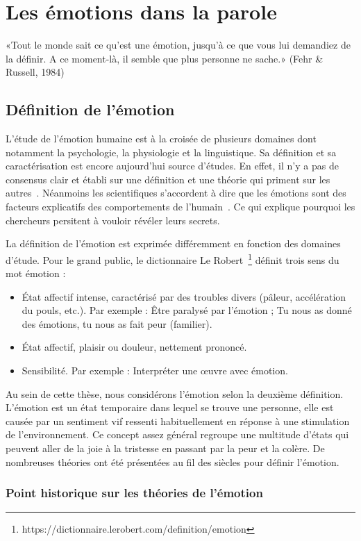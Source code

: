 \chapter{Les émotions dans la parole}
\label{chapitre1}
 	«Tout le monde sait ce qu’est une émotion, jusqu’à ce que vous lui demandiez de la définir. A ce moment-là, il semble que plus personne ne sache.» (Fehr \& Russell, 1984)


 \section{Définition de l'émotion}
L'étude de l'émotion humaine est à la croisée de plusieurs domaines dont notamment la psychologie, la physiologie et la linguistique. Sa définition et sa caractérisation est encore aujourd'hui source d'études. En effet, il n'y a pas de consensus clair et établi sur une définition et une théorie qui priment sur les autres~\cite{Kleinginna1981,Strongman1996}. Néanmoins les scientifiques s'accordent à dire que les émotions sont des facteurs explicatifs des comportements de l'humain~\cite{Gorman2003}. Ce qui explique pourquoi les chercheurs persitent à vouloir révéler leurs secrets.

La définition de l'émotion est exprimée différemment en fonction des domaines d'étude. Pour le grand public, le dictionnaire Le Robert~\footnote{https://dictionnaire.lerobert.com/definition/emotion} définit trois sens du mot émotion :
\begin{itemize}
    \item État affectif intense, caractérisé par des troubles divers (pâleur, accélération du pouls, etc.). Par exemple : Être paralysé par l'émotion ; Tu nous as donné des émotions, tu nous as fait peur (familier).
    \item État affectif, plaisir ou douleur, nettement prononcé.
    \item Sensibilité. Par exemple : Interpréter une œuvre avec émotion.
\end{itemize}
Au sein de cette thèse, nous considérons l'émotion selon la deuxième définition. L'émotion est un état temporaire dans lequel se trouve une personne, elle est causée par un sentiment vif ressenti habituellement en réponse à une stimulation de l'environnement. Ce concept assez général regroupe une multitude d'états qui peuvent aller de la joie à la tristesse en passant par la peur et la colère. De nombreuses théories ont été présentées au fil des siècles pour définir l'émotion.

\subsection{Point historique sur les théories de l'émotion}


